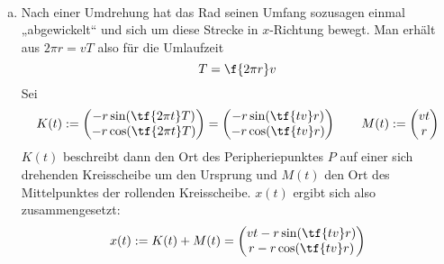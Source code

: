 \documentclass[a4paper]{scrartcl}
\begin{document}
	\begin{aufgabe}~

		\begin{enumerate}[a)]
			\item
				
		Nach einer Umdrehung hat das Rad seinen Umfang sozusagen einmal „abgewickelt“ und sich um diese Strecke in $x$-Richtung bewegt.
		Man erhält aus $2\pi r = v T$ also für die Umlaufzeit
		\[
			T = \f {2\pi r}v
		\]
		Sei
		\[
			K(t) := \begin{pmatrix}
				- r \sin (\tf {2\pi t}T) \\
				- r \cos (\tf {2\pi t}T) 
			\end{pmatrix}
			= \begin{pmatrix}
				- r \sin (\tf {tv}r) \\
				- r \cos (\tf {tv}r)
			\end{pmatrix}
			\qquad
			M(t) := \begin{pmatrix}
				v t \\
				r
			\end{pmatrix}
		\]
		$K(t)$ beschreibt dann den Ort des Peripheriepunktes $P$ auf einer sich drehenden Kreisscheibe um den Ursprung und $M(t)$ den Ort des Mittelpunktes der rollenden Kreisscheibe.
		$x(t)$ ergibt sich also zusammengesetzt:
		\[
			x(t) := K(t) + M(t) = \begin{pmatrix}
				vt - r \sin(\tf {tv}r) \\
				r - r \cos (\tf {tv}r)
			\end{pmatrix}
		\]


\end{enumerate}
\end{aufgabe}
\end{document}
